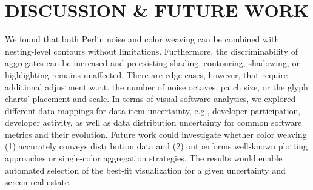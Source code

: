 \documentclass[sigconf]{acmart}
\begin{document}
\section{\uppercase{Discussion \& Future Work}}
\label{CW:Sec:ResultsAndDiscussion}

\noindent %
We found that both Perlin noise and color weaving can be combined with nesting-level contours without limitations.
Furthermore, the discriminability of aggregates can be increased and preexisting shading, contouring, shadowing, or highlighting remains unaffected.
There are edge cases, however, that require additional adjustment w.r.t. the number of noise octaves, patch size, or the glyph charts' placement and scale.
In terms of visual software analytics, we explored different data mappings for data item uncertainty, e.g., developer participation, developer activity, as well as data distribution uncertainty for common software metrics and their evolution.
Future work could investigate whether color weaving (1) accurately conveys distribution data and (2) outperforms well-known plotting approaches or single-color aggregation strategies.
The results would enable automated selection of the best-fit visualization for a given uncertainty and screen real estate.



\end{document}
